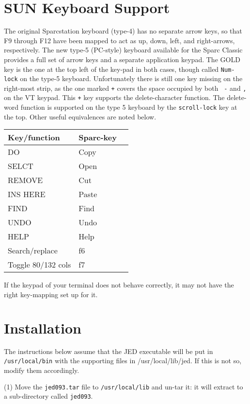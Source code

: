 \section{SUN Keyboard Support}

The original Sparcstation keyboard (type-4) has no separate arrow keys,
so that F9 through F12 have been mapped to act as up, down, left, and
right-arrows, respectively.  The new type-5 (PC-style) keyboard available
for the Sparc Classic provides a full set of arrow keys and a separate
application keypad.  The GOLD key is the one at the top left of the
key-pad in both cases, though called {\tt Num-lock} on the type-5
keyboard. Unfortunately there is still one key missing on the right-most
strip, as the one marked {\tt +} covers the space occupied by both {\tt
-} and {\tt ,} on the VT keypad. This {\tt +} key supports the
delete-character function.  The delete-word function is supported on the
type 5 keyboard by the {\tt scroll-lock} key at the top.  Other useful
equivalences are noted below.

\begin{center}
\begin{tabular}{|l|l|l|}
\hline
Key/function & Sparc-key \\
\hline
DO & Copy \\
SELCT & Open \\
REMOVE & Cut \\
INS HERE & Paste \\
FIND & Find \\
UNDO & Undo \\
HELP & Help \\
Search/replace & f6 \\
Toggle 80/132 cols & f7 \\
\hline
\end{tabular}
\end{center}

If the keypad of your terminal does not behave correctly, it may not have
the right key-mapping set up for it.

\section{Installation}

The instructions below assume that the JED executable will be put in
{\tt /usr/local/bin} with the supporting files in {/usr/local/lib/jed}. If
this is not so, modify them accordingly.

(1) Move the {\tt jed093.tar} file to {\tt /usr/local/lib} and un-tar it: it will
extract to a sub-directory called {\tt jed093}.

